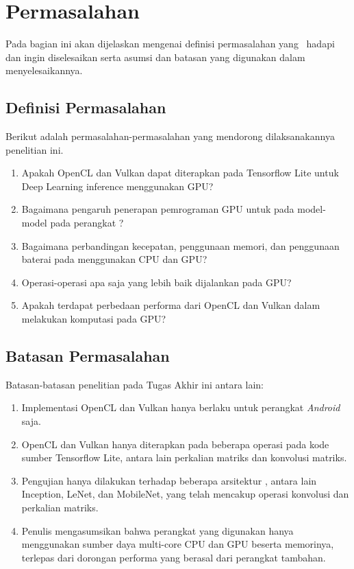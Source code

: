\section{Permasalahan}
Pada bagian ini akan dijelaskan mengenai definisi permasalahan 
yang \saya~hadapi dan ingin diselesaikan serta asumsi dan batasan 
yang digunakan dalam menyelesaikannya.


\subsection{Definisi Permasalahan}
Berikut adalah permasalahan-permasalahan yang mendorong dilaksanakannya penelitian ini.
\begin{enumerate}
\item Apakah OpenCL dan Vulkan dapat diterapkan pada Tensorflow Lite untuk Deep Learning inference menggunakan \mobile GPU?
\item Bagaimana pengaruh penerapan pemrograman GPU untuk \inference pada model-model \deeplearning pada perangkat \mobile?
\item Bagaimana perbandingan kecepatan, penggunaan memori, dan penggunaan baterai pada \deeplearning \inference menggunakan CPU dan GPU?
\item Operasi-operasi \deeplearning \inference apa saja yang lebih baik dijalankan pada \mobile GPU?
\item Apakah terdapat perbedaan performa dari OpenCL dan Vulkan dalam melakukan komputasi pada GPU?

\end{enumerate}

\subsection{Batasan Permasalahan}
Batasan-batasan penelitian pada Tugas Akhir ini antara lain:
\begin{enumerate}
\item Implementasi OpenCL dan Vulkan hanya berlaku untuk perangkat \textit{Android} saja.
\item OpenCL dan Vulkan hanya diterapkan pada beberapa operasi \deeplearning \inference pada kode sumber Tensorflow Lite, antara lain perkalian matriks dan konvolusi matriks.
\item Pengujian hanya dilakukan terhadap beberapa arsitektur \conv \nn, antara lain Inception, LeNet, dan MobileNet, yang telah mencakup operasi konvolusi dan perkalian matriks.
\item Penulis mengasumsikan bahwa perangkat yang digunakan hanya menggunakan sumber daya multi-core CPU dan GPU beserta memorinya, terlepas dari dorongan performa yang berasal dari perangkat tambahan.
\end{enumerate}

